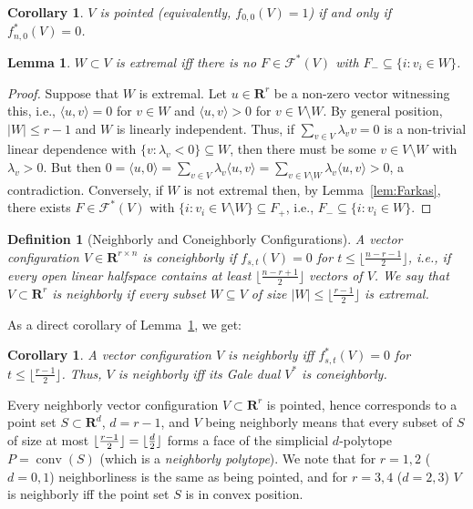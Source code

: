 \documentclass[11pt]{article}
\newtheorem{lemma}[theorem]{Lemma}
\newtheorem{corollary}[theorem]{Corollary}
\newtheorem{definition}[theorem]{Definition}
\DeclareMathOperator{\conv}{conv}
\renewcommand{\leq}{\leqslant}
\newcommand{\R}{\mathbf{R}}
\DeclarePairedDelimiter\floor{\lfloor}{\rfloor}
\begin{document}
\begin{corollary}
$V$ is pointed (equivalently, $f_{0,0}(V)=1$) if and only if $f^*_{n,0}(V)=0$.
\end{corollary}
%
\begin{lemma} 
\label{lem:char-extremal}
$W \subset V$ is extremal iff there is no $F\in \mathcal{F}^*(V)$ with $F_- \subseteq \{i\colon v_i \in W\}$.
\end{lemma}
\begin{proof}
Suppose that $W$ is extremal. Let $u\in \R^r$ be a non-zero vector witnessing this, i.e., $\langle u, v\rangle =0$ for $v \in W$ and $\langle u, v\rangle >0$ for $v\in V\setminus W$. By general position, $|W|\leq r-1$ and $W$ is linearly independent. Thus, if $\sum_{v\in V} \lambda_v v=0$ is a non-trivial linear dependence with $\{v \colon \lambda_v<0\}\subseteq W$, then there must be some $v \in V\setminus W$  with $\lambda_v > 0$. But then $0=\langle u,0\rangle = \sum_{v\in V} \lambda_v \langle u,v\rangle =\sum_{v\in V\setminus W} \lambda_v \langle u,v\rangle >0$, a contradiction.
%
Conversely, if $W$ is not extremal then, by Lemma~\ref{lem:Farkas}, there exists $F \in \mathcal{F}^*(V)$ with $\{i \colon v_i\in V\setminus W\} \subseteq F_+$, i.e., $F_- \subseteq \{i\colon v_i \in W\}$.
\end{proof}
%
\begin{definition}[{Neighborly and Coneighborly Configurations}] A vector configuration $V\in \R^{r \times n}$ is \emph{coneighborly} if $f_{s,t}(V) = 0$ for $t \leq \lfloor \frac{n-r-1}{2} \rfloor$, i.e., if every open linear halfspace contains at least $\lfloor \frac{n-r+1}{2} \rfloor$ vectors of $V$. 
%
We say that  $V \subset \R^r$ is \emph{neighborly} if every subset $W \subseteq V$ of size $|W| \leq \lfloor \frac{r-1}{2} \rfloor$ is \emph{extremal}.
\end{definition}
%
As a direct corollary of Lemma~\ref{lem:char-extremal}, we get:
\begin{corollary} 
\label{cor:neighborly-alternative}
A vector configuration  $V$ is neighborly iff $f^*_{s,t}(V)=0$ for $t \leq \lfloor \frac{r-1}{2} \rfloor$. Thus, $V$ is neighborly iff its Gale dual $V^*$ is coneighborly.
\end{corollary}
%
Every neighborly vector configuration $V \subset \R^r$ is pointed, hence corresponds to a point set $S\subset \R^d$, $d=r-1$, and $V$ being neighborly means that every subset of $S$ of size at most $\floor{\frac{r-1}{2}}=\floor{\frac{d}{2}}$ forms a face of the simplicial $d$-polytope $P=\conv(S)$ (which is a \emph{neighborly polytope}). We note that for $r=1,2$ ($d=0,1$) neighborliness is the same as being pointed, and for $r=3,4$ ($d=2,3$) $V$ is neighborly iff the point set $S$ is in convex position.
\end{document}
